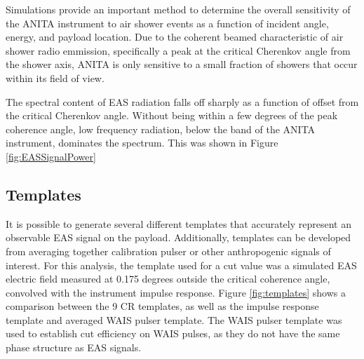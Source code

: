 		Simulations provide an important method to determine the overall sensitivity of the ANITA instrument to air shower events as a function of incident angle, energy, and payload location.  Due to the coherent beamed characteristic of air shower radio emmission, specifically a peak at the critical Cherenkov angle from the shower axis, ANITA is only sensitive to a small fraction of showers that occur within its field of view.
		
		The spectral content of EAS radiation falls off sharply as a function of offset from the critical Cherenkov angle.  Without being within a few degrees of the peak coherence angle, low frequency radiation, below the band of the ANITA instrument, dominates the spectrum.  This was shown in Figure \ref{fig:EASSignalPower}

	
	\subsection{Templates}
		It is possible to generate several different templates that accurately represent an observable EAS signal on the payload.  Additionally, templates can be developed from averaging together calibration pulser or other anthropogenic signals of interest.  For this analysis, the template used for a cut value was a simulated EAS electric field measured at 0.175 degrees outside the critical coherence angle, convolved with the instrument impulse response.  Figure \ref{fig:templates} shows a comparison between the 9 CR templates, as well as the impulse response template and averaged WAIS pulser template.  The WAIS pulser template was used to establish cut efficiency on WAIS pulses, as they do not have the same phase structure as EAS signals.
		
